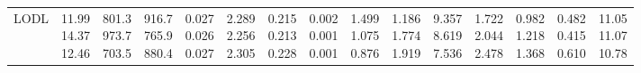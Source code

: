 \begin{landscape}
\begin{table}[t]
{\begin{tabular}{@{}lrrrrrrrrrrrrrr@{}}
LODL & \makecell[r]{11.99\\14.37\\12.46} & \makecell[r]{801.3\\973.7\\703.5} & \makecell[r]{916.7\\765.9\\880.4} & \makecell[r]{0.027\\0.026\\0.027} & \makecell[r]{2.289\\2.256\\2.305} & \makecell[r]{0.215\\0.213\\0.228} & \makecell[r]{0.002\\0.001\\0.001} & \makecell[r]{1.499\\1.075\\0.876} & \makecell[r]{1.186\\1.774\\1.919} & \makecell[r]{9.357\\8.619\\7.536} & \makecell[r]{1.722\\2.044\\2.478} & \makecell[r]{0.982\\1.218\\1.368} & \makecell[r]{0.482\\0.415\\0.610} & \makecell[r]{11.05\\11.07\\10.78} \\

\end{tabular}}
\end{table}
\end{landscape}
